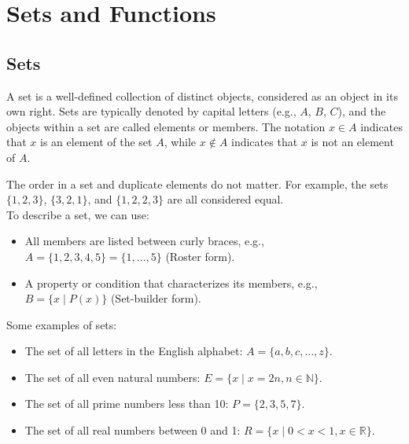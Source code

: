 \chapter{Sets and Functions}

\section{Sets}
\begin{definition}[Set]
    A set is a well-defined collection of distinct objects, considered as an object in its own right. Sets are typically denoted by capital letters (e.g., $A$, $B$, $C$), and the objects within a set are called elements or members. The notation $x \in A$ indicates that $x$ is an element of the set $A$, while $x \notin A$ indicates that $x$ is not an element of $A$.
\end{definition}
The order in a set and duplicate elements do not matter. For example, the sets $\{1, 2, 3\}$, $\{3, 2, 1\}$, and $\{1, 2, 2, 3\}$ are all considered equal. \\
To describe a set, we can use:
\begin{itemize}[itemsep=1pt,label=$\circ$]
    \item All members are listed between curly braces, e.g., $A = \{1, 2, 3, 4, 5\} = \{1, \ldots, 5\}$ (Roster form).
    \item A property or condition that characterizes its members, e.g., $B = \{x \mid P(x)\}$ (Set-builder form).
\end{itemize}

\begin{eg}
    Some examples of sets:
    \begin{itemize}[itemsep=1pt,label=$\circ$]
        \item The set of all letters in the English alphabet: $A = \{a, b, c, \ldots, z\}$.
        \item The set of all even natural numbers: $E = \{x \mid x = 2n, n \in \mathbb{N}\}$.
        \item The set of all prime numbers less than 10: $P = \{2, 3, 5, 7\}$.
        \item The set of all real numbers between 0 and 1: $R = \{x \mid 0 < x < 1, x \in \mathbb{R}\}$.
    \end{itemize}
\end{eg}

